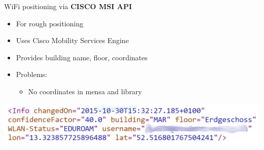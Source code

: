 \documentclass[11pt]{beamer}
\begin{document}
\begin{frame}{WiFi positioning via \textbf{CISCO MSI API}}
    
     {
	    
	    \begin{itemize}
	    
	        \item For rough positioning
	        \item Uses Cisco Mobility Services Engine
	        \item Provides building name, floor, coordinates
    	    \item Problems:
	            \begin{itemize}
	            	\setlength{\itemsep}{0.2ex}
	                \item No coordinates in mensa and library
	            \end{itemize}
    
	    \end{itemize}
	}
    
     {
    
    	\begin{center}
	    
	        \includegraphics[width=\textwidth]{tubitapi_response}
		   
	    \end{center}
	
	}
    
\end{frame}
\end{document}
